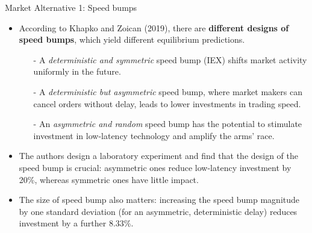 \documentclass{beamer}
\begin{document}
\begin{frame}{Market Alternative 1: Speed bumps}

\begin{itemize}
    \item According to Khapko and Zoican (2019), there are \textbf{different designs of speed bumps}, which yield different equilibrium predictions.
    \begin{itemize}
        \item[-] A \textit{deterministic and symmetric} speed bump (IEX) shifts market activity uniformly in the future.
        \item[-] A \textit{deterministic but asymmetric} speed bump, where market makers can cancel orders without delay, leads to lower investments in trading speed.
        \item[-] An \textit{asymmetric and random} speed bump has the potential to stimulate investment in low-latency technology and amplify the arms’ race.
    \end{itemize}
    \item The authors design a laboratory experiment and find that the design of the speed bump is crucial: asymmetric ones reduce low-latency investment by 20\%, whereas symmetric ones have little impact.
    \item The size of speed bump also matters: increasing the speed bump magnitude by one standard deviation (for an asymmetric, deterministic delay) reduces investment by a further 8.33\%.
\end{itemize}

\end{frame}


\end{document}
